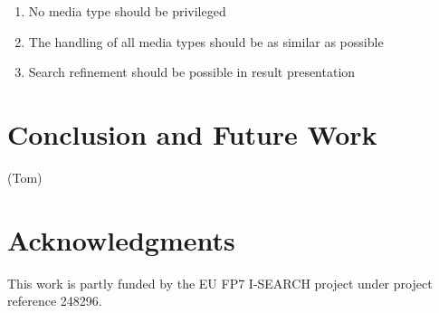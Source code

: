 \documentclass[runningheads,a4paper]{llncs} \usepackage[utf8]{inputenc}
\begin{document}
\begin{enumerate}
  \item No media type should be privileged
  \item The handling of all media types should be as similar as possible
  \item Search refinement should be possible in result presentation  
\end{enumerate}

\section{Conclusion and Future Work}
(Tom)

\section{Acknowledgments}
This work is partly funded by the EU FP7 \mbox{I-SEARCH} project under project reference 248296.



\end{document}
